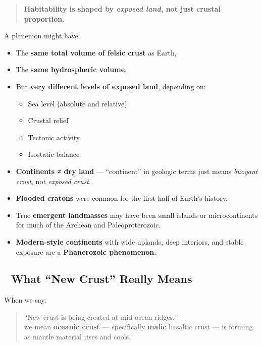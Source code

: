 \documentclass[
  letterpaper,
]{book}
\providecommand{\tightlist}{%
  \setlength{\itemsep}{0pt}\setlength{\parskip}{0pt}}
\begin{document}
\begin{quote}
\textbf{Habitability is shaped by \emph{exposed land}, not just crustal
proportion.}
\end{quote}

A planemon might have:

\begin{itemize}
\tightlist
\item
  The \textbf{same total volume of felsic crust} as Earth,\\
\item
  The \textbf{same hydrospheric volume},\\
\item
  But \textbf{very different levels of exposed land}, depending on:

  \begin{itemize}
  \tightlist
  \item
    Sea level (absolute and relative)\\
  \item
    Crustal relief\\
  \item
    Tectonic activity\\
  \item
    Isostatic balance
  \end{itemize}
\item
  \textbf{Continents ≠ dry land} --- ``continent'' in geologic terms
  just means \emph{buoyant crust}, not \emph{exposed crust}.
\item
  \textbf{Flooded cratons} were common for the first half of Earth's
  history.\\
\item
  True \textbf{emergent landmasses} may have been small islands or
  microcontinents for much of the Archean and Paleoproterozoic.\\
\item
  \textbf{Modern-style continents} with wide uplands, deep interiors,
  and stable exposure are a \textbf{Phanerozoic phenomenon}.
\end{itemize}

\subsection{🔹 What ``New Crust'' Really
Means}\label{what-new-crust-really-means}

When we say:

\begin{quote}
``New crust is being created at mid-ocean ridges,''\\
we mean \textbf{oceanic crust} --- specifically \textbf{mafic} basaltic
crust --- is forming as mantle material rises and cools.
\end{quote}
\end{document}
